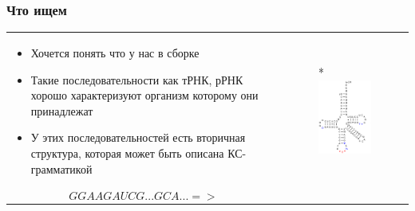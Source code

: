 \documentclass{beamer}
\begin{document}
\begin{frame}
    \frametitle{Что ищем}
    \begin{tabular}{p{6cm} p{5cm}}
        \begin{itemize}
            \item Хочется понять что у нас в сборке
            \item Такие последовательности как тРНК, рРНК хорошо характеризуют организм которому они принадлежат
            \item У этих последовательностей есть вторичная структура, которая может быть описана КС-грамматикой
        \end{itemize}
        &
        \begin{figure}[b]
            \centering
            \multirow{-3}*{\includegraphics[width=5.2cm]{pictures/TRNA.png}}
        \end{figure}
        \\
        $$
        GGAAGAUCG...GCA...  =>
        $$
        &
    \end{tabular}  
\end{frame}
\end{document}
